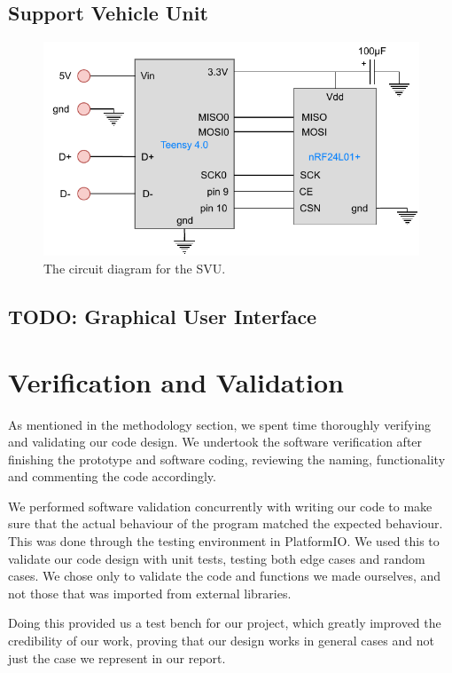 \documentclass[conference]{IEEEtran}
\newcommand{\todo}[1]{{\color{olive} TODO: #1}}
\begin{document}
\subsection{Support Vehicle Unit}
\begin{figure}
    \centering
    \includegraphics[width=\linewidth]{documentation/images/SVU_CircuitDiagram.pdf}
    \caption{The circuit diagram for the SVU.}
    \label{fig:SCU_circuit}
\end{figure}
\subsection{\todo{Graphical User Interface}}


\section{Verification and Validation} %
As mentioned in the methodology section, we spent time thoroughly verifying and validating our code design. We undertook the software verification after finishing the prototype and software coding, reviewing the naming, functionality and commenting the code accordingly.

We performed software validation concurrently with writing our code to make sure that the actual behaviour of the program matched the expected behaviour. This was done through the testing environment in PlatformIO. We used this to validate our code design with unit tests, testing both edge cases and random cases. We chose only to validate the code and functions we made ourselves, and not those that was imported from external libraries.

Doing this provided us a test bench for our project, which greatly improved the credibility of our work, proving that our design works in general cases and not just the case we represent in our report.
\end{document}
